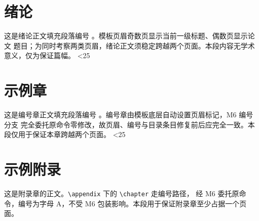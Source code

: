 \documentclass[doctor]{htuthesis}
\begin{document}
\frontmatter
\tableofcontents            %

\mainmatter

\chapter*{绪论}
\setcounter{filler@xulun}{0}
\loop
{}
这是绪论正文填充段落编号 。模板页眉奇数页显示当前一级标题、偶数页显示论文
题目；为同时考察两类页眉，绪论正文须稳定跨越两个页面。本段内容无学术意义，仅为保证篇幅。
\ifnum\value{filler@xulun}<25 \repeat

\chapter{示例章}
\setcounter{filler@shili}{0}
\loop
{}
这是编号章正文填充段落编号 。编号章由模板底层自动设置页眉标记，M6 编号分支
完全委托原命令零修改，故页眉、编号与目录条目修复前后应完全一致。本段仅用于保证本章跨越两个页面。
\ifnum\value{filler@shili}<25 \repeat

\appendix
\chapter{示例附录}
这是附录章的正文。\texttt{\textbackslash appendix} 下的 \texttt{\textbackslash chapter} 走编号路径，
经 M6 委托原命令，编号为字母 A，不受 M6 包装影响。本段用于保证附录章至少占据一个页面。
\end{document}

